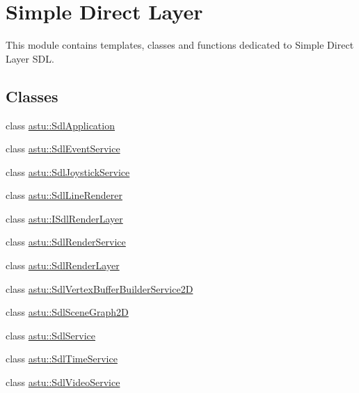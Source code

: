 \hypertarget{group__sdl__group}{}\section{Simple Direct Layer}
\label{group__sdl__group}


This module contains templates, classes and functions dedicated to Simple Direct Layer S\+DL.  


\subsection*{Classes}
\begin{DoxyCompactItemize}
\item 
class \hyperlink{classastu_1_1SdlApplication}{astu\+::\+Sdl\+Application}
\item 
class \hyperlink{classastu_1_1SdlEventService}{astu\+::\+Sdl\+Event\+Service}
\item 
class \hyperlink{classastu_1_1SdlJoystickService}{astu\+::\+Sdl\+Joystick\+Service}
\item 
class \hyperlink{classastu_1_1SdlLineRenderer}{astu\+::\+Sdl\+Line\+Renderer}
\item 
class \hyperlink{classastu_1_1ISdlRenderLayer}{astu\+::\+I\+Sdl\+Render\+Layer}
\item 
class \hyperlink{classastu_1_1SdlRenderService}{astu\+::\+Sdl\+Render\+Service}
\item 
class \hyperlink{classastu_1_1SdlRenderLayer}{astu\+::\+Sdl\+Render\+Layer}
\item 
class \hyperlink{classastu_1_1SdlVertexBufferBuilderService2D}{astu\+::\+Sdl\+Vertex\+Buffer\+Builder\+Service2D}
\item 
class \hyperlink{classastu_1_1SdlSceneGraph2D}{astu\+::\+Sdl\+Scene\+Graph2D}
\item 
class \hyperlink{classastu_1_1SdlService}{astu\+::\+Sdl\+Service}
\item 
class \hyperlink{classastu_1_1SdlTimeService}{astu\+::\+Sdl\+Time\+Service}
\item 
class \hyperlink{classastu_1_1SdlVideoService}{astu\+::\+Sdl\+Video\+Service}
\end{DoxyCompactItemize}
